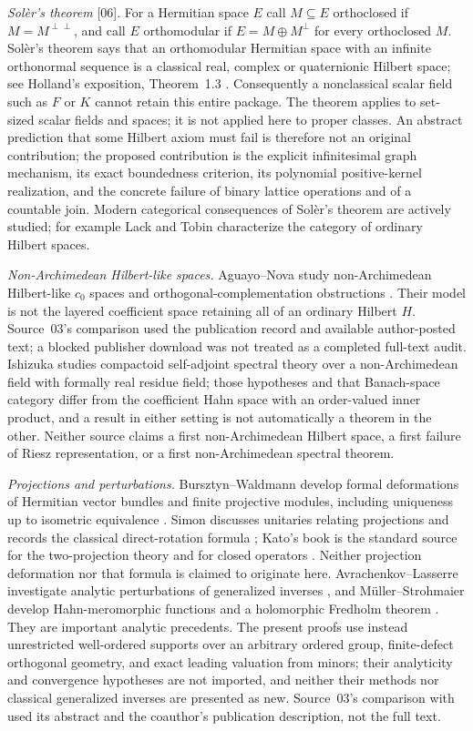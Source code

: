 \documentclass[11pt,letterpaper]{article}
\numberwithin{equation}{section}
\theoremstyle{definition}
\theoremstyle{remark}
\newcommand{\F}{F}
\newcommand{\K}{K}
\newcommand{\src}[1]{\textup{\textsf{\small[#1]}}}
\begin{document}
\emph{Sol\`er's theorem} \src{06}. For a Hermitian space $E$ call
$M\subseteq E$ orthoclosed if $M=M^{\perp\perp}$, and call $E$ orthomodular
if $E=M\oplus M^\perp$ for every orthoclosed $M$. Sol\`er's theorem says
that an orthomodular Hermitian space with an infinite orthonormal sequence is
a classical real, complex or quaternionic Hilbert space; see Holland's
exposition, Theorem~1.3 \cite{Holland,Soler}. Consequently a nonclassical
scalar field such as $\F$ or $\K$ cannot retain this entire package. The
theorem applies to set-sized scalar fields and spaces; it is not applied here
to proper classes. An abstract prediction that some Hilbert axiom must fail is
therefore not an original contribution; the proposed contribution is the
explicit infinitesimal graph mechanism, its exact boundedness criterion, its
polynomial positive-kernel realization, and the concrete failure of binary
lattice operations and of a countable join. Modern categorical consequences
of Sol\`er's theorem are actively studied; for example Lack and Tobin
\cite{LackTobin} characterize the category of ordinary Hilbert spaces.

\emph{Non-Archimedean Hilbert-like spaces.} Aguayo--Nova study
non-Archimedean Hilbert-like $c_0$ spaces and orthogonal-complementation
obstructions \cite{AN}. Their model is not the layered coefficient space
retaining all of an ordinary Hilbert $H$. Source~03's comparison used the
publication record and available author-posted text; a blocked publisher
download was not treated as a completed full-text audit. Ishizuka
\cite{Ishizuka} studies compactoid self-adjoint spectral theory over a
non-Archimedean field with formally real residue field; those hypotheses and
that Banach-space category differ from the coefficient Hahn space with an
order-valued inner product, and a result in either setting is not
automatically a theorem in the other. Neither source claims a first
non-Archimedean Hilbert space, a first failure of Riesz representation, or a
first non-Archimedean spectral theorem.

\emph{Projections and perturbations.} Bursztyn--Waldmann develop formal
deformations of Hermitian vector bundles and finite projective modules,
including uniqueness up to isometric equivalence \cite{BW}. Simon discusses
unitaries relating projections and records the classical direct-rotation
formula \cite{Simon,SimonKato}; Kato's book is the standard source for the
two-projection theory and for closed operators \cite{Kato}. Neither
projection deformation nor that formula is claimed to originate here.
Avrachenkov--Lasserre investigate analytic perturbations of generalized
inverses \cite{Avrachenkov}, and M\"uller--Strohmaier develop
Hahn-meromorphic functions and a holomorphic Fredholm theorem \cite{MS}. They
are important analytic precedents. The present proofs use instead
unrestricted well-ordered supports over an arbitrary ordered group,
finite-defect orthogonal geometry, and exact leading valuation from minors;
their analyticity and convergence hypotheses are not imported, and neither
their methods nor classical generalized inverses are presented as new.
Source~03's comparison with \cite{Avrachenkov} used its abstract and the
coauthor's publication description, not the full text.
\end{document}
